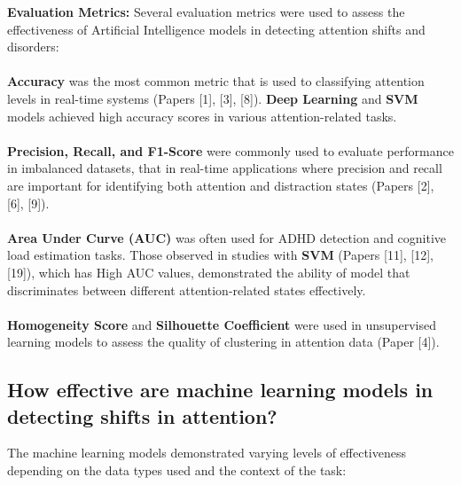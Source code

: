 \documentclass[12pt]{article}
\begin{document}
\textbf{Evaluation Metrics:} Several evaluation metrics were used to assess the effectiveness of Artificial Intelligence models in detecting attention shifts and disorders:  \\ \\
\textbullet \textbf{Accuracy} was the most common metric that is used to classifying attention levels in real-time systems (Papers [1], [3], [8]). \textbf{Deep Learning} and \textbf{SVM} models achieved high accuracy scores in various attention-related tasks.  \\ \\
\textbullet \textbf{Precision, Recall, and F1-Score} were commonly used to evaluate performance in imbalanced datasets, that in real-time applications where precision and recall are important for identifying both attention and distraction states (Papers [2], [6], [9]).  \\ \\
\textbullet \textbf{Area Under Curve (AUC)} was often used for ADHD detection and cognitive load estimation tasks. Those observed in studies with \textbf{SVM} (Papers [11], [12], [19]), which has High AUC values, demonstrated the ability of model that discriminates between different attention-related states effectively.  \\ \\
\textbullet \textbf{Homogeneity Score} and \textbf{Silhouette Coefficient} were used in unsupervised learning models to assess the quality of clustering in attention data (Paper [4]).  \\ 

\subsection{How effective are machine learning models in detecting shifts in attention?} 
The machine learning models demonstrated varying levels of effectiveness depending on the data types used and the context of the task: \\ 
\end{document}
